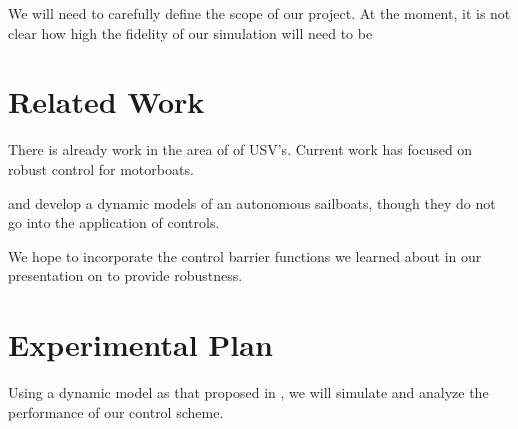 \documentclass[conference]{IEEEtran}
\begin{document}
We will need to carefully define the scope of our project. At the moment, it is not clear how high the fidelity of our simulation will need to be 
\section{Related Work}
There is already work in the area of of USV's. Current work has focused on robust control for motorboats.

\cite{Setiawan2020} and \cite{Buehler2018} develop a dynamic models of an autonomous sailboats, though they do not go into the application of controls.

We hope to incorporate the control barrier functions we learned about in our presentation on \cite{Ames2019} to provide robustness.


\section{Experimental Plan}
Using a dynamic model as that proposed in \cite{Buehler2018}, we will simulate and analyze the performance of our control scheme.



\end{document}
